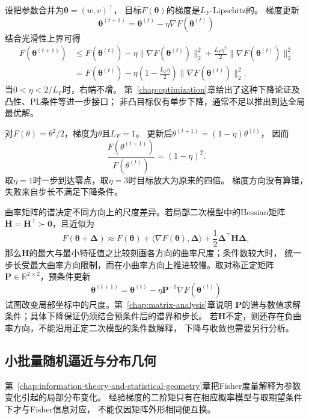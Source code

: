 设把参数合并为$\bm\theta=(w,v)^{\top}$，
目标$F(\bm\theta)$的梯度是$L_F$-Lipschitz的。
梯度更新
\[
  \bm{\theta}^{(t+1)}
  =
  \bm{\theta}^{(t)}
  -
  \eta\nabla F(\bm{\theta}^{(t)})
\]
结合光滑性上界可得
\begin{align}
  F(\bm{\theta}^{(t+1)})
  &\leq
  F(\bm{\theta}^{(t)})
  -
  \eta\lVert\nabla F(\bm{\theta}^{(t)})\rVert_2^2
  +
  \frac{L_F\eta^2}{2}
  \lVert\nabla F(\bm{\theta}^{(t)})\rVert_2^2
  \nonumber\\
  &=
  F(\bm{\theta}^{(t)})
  -
  \eta
  \left(1-\frac{L_F\eta}{2}\right)
  \lVert\nabla F(\bm{\theta}^{(t)})\rVert_2^2.
  \label{eq:future-gradient-descent-one-step}
\end{align}
当$0<\eta<2/L_F$时，右端不增。
第~\ref{chap:optimization}章给出了这种下降论证及凸性、PL条件等进一步接口；
非凸目标仅有单步下降，通常不足以推出到达全局最优解。

\begin{example}[步长跨过下降范围]
  \label{ex:future-training-step-size}
  对$F(\theta)=\theta^2/2$，梯度为$\theta$且$L_F=1$。
  更新后$\theta^{(t+1)}=(1-\eta)\theta^{(t)}$，
  因而
  \[
    \frac{F(\theta^{(t+1)})}{F(\theta^{(t)})}
    =
    (1-\eta)^2.
  \]
  取$\eta=1$时一步到达零点，取$\eta=3$时目标放大为原来的四倍。
  梯度方向没有算错，失败来自步长不满足下降条件。
\end{example}

曲率矩阵的谱决定不同方向上的尺度差异。若局部二次模型中的Hessian矩阵
\(\bm H=\bm H^{\top}\succ\bm0\)，且近似为
\[
  F(\bm{\theta}+\bm{\Delta})
  \approx
  F(\bm{\theta})
  +
  \langle\nabla F(\bm{\theta}),\bm{\Delta}\rangle
  +
  \frac{1}{2}
  \bm{\Delta}^{\top}\bm{H}\bm{\Delta},
\]
那么\(\bm H\)的最大与最小特征值之比较刻画各方向的曲率尺度；条件数较大时，
统一步长受最大曲率方向限制，而在小曲率方向上推进较慢。取对称正定矩阵
\(\bm P\in\mathbb{R}^{2\times2}\)，预条件更新
\[
  \bm{\theta}^{(t+1)}
  =
  \bm{\theta}^{(t)}
  -
  \eta\bm{P}^{-1}\nabla F(\bm{\theta}^{(t)})
\]
试图改变局部坐标中的尺度。第~\ref{chap:matrix-analysis}章说明
$\bm{P}$的谱与数值求解条件；具体下降保证仍须结合预条件后的谱界和步长。
若\(\bm H\)不定，则还存在负曲率方向，不能沿用正定二次模型的条件数解释，
下降与收敛也需要另行分析。

\subsection{小批量随机逼近与分布几何}
\label{sec:future-minibatch-stochastic-approximation-geometry}

第~\ref{chap:information-theory-and-statistical-geometry}章把Fisher度量解释为参数
变化引起的局部分布变化。
经验梯度的二阶矩只有在相应概率模型与取期望条件下才与Fisher信息对应，
不能仅因矩阵外形相同便互换。

